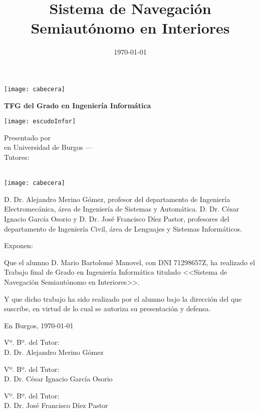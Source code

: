 \documentclass[a4paper,11pt,twoside]{memoir}
\title{Sistema de Navegación Semiautónomo en Interiores}
\author{\nombre}
\date{\today}
\makeatletter
\newcommand{\tutor}[1]{\def\@tutor{#1}}
\newcommand{\cotutorOne}[1]{\def\@cotutorOne{#1}}
\newcommand{\cotutorTwo}[1]{\def\@cotutorTwo{#1}}
\def\maketitle{
  \null
  \thispagestyle{empty}
\noindent\texttt{[image: cabecera]}\vspace{1cm}%
  \vfill
  \colorbox{cpardoBox}{%
    \begin{minipage}{.9\textwidth}
      \vspace{.5cm}\large
      \begin{center}
      \textbf{TFG del Grado en Ingeniería Informática}\vspace{.6cm}\\
      \textbf{\@title{}}
      \end{center}
      \vspace{.2cm}
    \end{minipage}

  }%
  \hfill\begin{minipage}{.20\textwidth}
    \texttt{[image: escudoInfor]}
  \end{minipage}
  \vfill
  \begin{center}%
  {%
    \noindent\large
    Presentado por \@author{}\\ 
    en Universidad de Burgos --- \@date{}\vspace{.6cm}\\
    \noindent Tutores: \@tutor{}\\\@cotutorOne{}\\\@cotutorTwo{}
  }%
  \end{center}%
  \null
  \cleardoublepage
  }
\newcommand{\nombre}{Mario Bartolomé Manovel} %
\makeatother
\begin{document}
\maketitle
\def\titulo{Sistema de Navegación Semiautónomo en Interiores}
\def\tutor{Dr. Alejandro Merino Gómez}
\def\cotutorOne{Dr. César Ignacio García Osorio}
\def\cotutorTwo{Dr. José Francisco Díez Pastor}




\noindent\texttt{[image: cabecera]}\vspace{1cm}

\noindent D. \tutor, profesor del departamento de Ingeniería Electromecánica, área de Ingeniería de Sistemas y Automática. D. \cotutorOne{} y D. \cotutorTwo{}, profesores del departamento de Ingeniería Civil, área de Lenguajes y Sistemas Informáticos.

\noindent Exponen:

\noindent Que el alumno D. \nombre, con DNI 71298657Z, ha realizado el Trabajo final de Grado en Ingeniería Informática titulado <<\titulo>>. 

\noindent Y que dicho trabajo ha sido realizado por el alumno bajo la dirección del que suscribe, en virtud de lo cual se autoriza su presentación y defensa.

\begin{center} %
En Burgos, {\large \today}
\end{center}

\vfill\vfill\vfill


\begin{minipage}{0.3\textwidth}
\raggedright
Vº. Bº. del Tutor:\\[2cm]
D. \tutor
\end{minipage}
\hfill
\begin{minipage}{0.3\textwidth}
\centering
Vº. Bº. del Tutor:\\[2cm]
D. \cotutorOne
\end{minipage}
\hfill
\begin{minipage}{0.3\textwidth}
\raggedleft
Vº. Bº. del Tutor:\\[2cm]
D. \cotutorTwo
\end{minipage}
\hfill
\vfill

%
\end{document}
